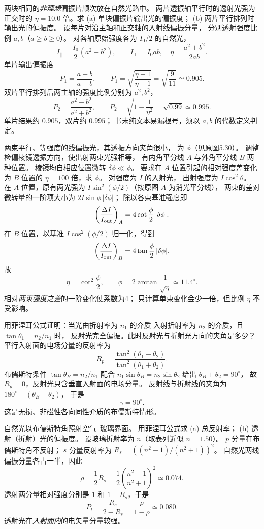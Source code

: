 两块相同的\emph{非理想}偏振片顺次放在自然光路中。
两片透振轴平行时的透射光强为正交时的
$\eta=10.0$ 倍。求 (a) 单块偏振片输出光的偏振度；
(b) 两片平行排列时输出光的偏振度。
\exsolution
设每片对沿主轴和正交轴的入射线偏振分量，
分别透射强度比例 $a,b$（$a\ge b\ge0$）。
对各轴原始强度各为 $I_0/2$ 的自然光，
\[
 I_\parallel=\frac{I_0}{2}(a^2+b^2),\qquad
 I_\perp=I_0 ab,
 \quad\eta=\frac{a^2+b^2}{2ab}.
\]
单片输出偏振度
\[
 P_1=\frac{a-b}{a+b},\qquad
 \boxed{P_1=\sqrt{\frac{\eta-1}{\eta+1}}
 =\sqrt{\frac9{11}}\simeq0.905}.
\]
双片平行排列后两主轴的强度比例分别为 $a^2,b^2$，
\[
 P_2=\frac{a^2-b^2}{a^2+b^2},\qquad
 \boxed{P_2=\sqrt{1-\frac1{\eta^2}}
 =\sqrt{0.99}\simeq0.995}.
\]
\excheck 单片结果约 $0.905$，双片约 $0.995$；
书末纯文本易漏根号，须以 $a,b$ 的代数定义判定。

两束平行、等强度的线偏振光，其透振方向夹角很小，
为 $\phi$（见原图5.30）。
调整检偏棱镜透振方向，使出射两束光强相等，
有内角平分线 $A$ 与外角平分线 $B$ 两种位置。
棱镜均自相应位置微转 $\delta\phi\ll\phi$。
要求在 $A$ 位置引起的相对强度差变化
为 $B$ 位置的 $\eta=100$ 倍，求 $\phi$。
\exsolution
对强度为 $I$ 的入射光，
出射强度为 $I\cos^2\theta$。
在 $A$ 位置，原有两光强为
$I\sin^2(\phi/2)$（按原图 $A$ 为消光平分线），
两束的差对微转量的一阶项大小为
$2I\sin\phi\,|\delta\phi|$；
除以各束基准强度即
\[
 \left(\frac{\Delta I}{I_{\rm out}}\right)_A
 =4\cot\frac\phi2\,|\delta\phi|.
\]
在 $B$ 位置，以基准 $I\cos^2(\phi/2)$ 归一化，得到
\[
 \left(\frac{\Delta I}{I_{\rm out}}\right)_B
 =4\tan\frac\phi2\,|\delta\phi|.
\]
故
\[
 \eta=\cot^2\frac\phi2,\qquad
 \boxed{\phi=2\arctan\frac1{\sqrt\eta}\simeq11.4^\circ}.
\]
\excheck 相对\emph{两束强度之差}的一阶变化使系数为4；
只计算单束变化会少一倍，但比例 $\eta$ 不受影响。

用菲涅耳公式证明：当光由折射率为 $n_1$ 的介质
入射折射率为 $n_2$ 的介质，且
$\tan\theta_1=n_2/n_1$ 时，
反射光完全偏振。此时反射光与折射光方向的夹角是多少？
\exsolution
平行入射面的电场分量的反射率为
\[
 R_p=\frac{\tan^2(\theta_1-\theta_2)}
 {\tan^2(\theta_1+\theta_2)}.
\]
布儒斯特条件
$\tan\theta_B=n_2/n_1$ 配合
$n_1\sin\theta_B=n_2\sin\theta_2$
给出 $\theta_B+\theta_2=90^\circ$，
故 $R_p=0$，反射光只含垂直入射面的电场分量。
反射线与折射线的夹角为
$180^\circ-(\theta_B+\theta_2)$，
于是
\[
 \boxed{\gamma=90^\circ}.
\]
\excheck 这是无损、非磁性各向同性介质的布儒斯特情形。

自然光以布儒斯特角照射空气--玻璃界面。
用菲涅耳公式求 (a) 总反射率；
(b) 透射（折射）光的偏振度。
\exsolution
设玻璃折射率为 $n$（取表列近似 $n=1.50$）。
$p$ 分量在布儒斯特角不反射；
$s$ 分量反射率为
$R_s=((n^2-1)/(n^2+1))^2$。
自然光两线偏振分量各占一半，因此
\[
 \boxed{\rho=\frac12 R_s
 =\frac12\left(\frac{n^2-1}{n^2+1}\right)^2
 \simeq0.074}.
\]
透射两分量相对强度分别是
$1$ 和 $1-R_s$，于是
\[
 \boxed{P_t=\frac{R_s}{2-R_s}
 =\frac{\rho}{1-\rho}\simeq0.080}.
\]
\excheck 透射光在\emph{入射面内}的电矢量分量较强。

